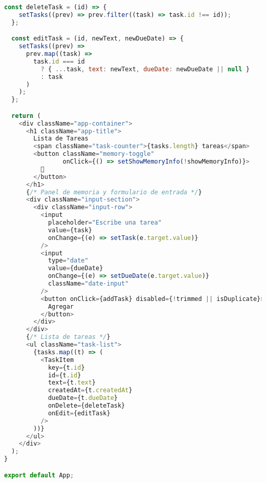 \documentclass[12pt,a4paper]{article}
\begin{document}
\begin{lstlisting}[language=JavaScript,caption={Estructura principal de la aplicación}]
  const deleteTask = (id) => {
    setTasks((prev) => prev.filter((task) => task.id !== id));
  };

  const editTask = (id, newText, newDueDate) => {
    setTasks((prev) => 
      prev.map((task) => 
        task.id === id 
          ? { ...task, text: newText, dueDate: newDueDate || null }
          : task
      )
    );
  };

  return (
    <div className="app-container">
      <h1 className="app-title">
        Lista de Tareas
        <span className="task-counter">{tasks.length} tareas</span>
        <button className="memory-toggle" 
                onClick={() => setShowMemoryInfo(!showMemoryInfo)}>
          💾
        </button>
      </h1>
      {/* Panel de memoria y formulario de entrada */}
      <div className="input-section">
        <div className="input-row">
          <input
            placeholder="Escribe una tarea"
            value={task}
            onChange={(e) => setTask(e.target.value)}
          />
          <input
            type="date"
            value={dueDate}
            onChange={(e) => setDueDate(e.target.value)}
            className="date-input"
          />
          <button onClick={addTask} disabled={!trimmed || isDuplicate}>
            Agregar
          </button>
        </div>
      </div>
      {/* Lista de tareas */}
      <ul className="task-list">
        {tasks.map((t) => (
          <TaskItem
            key={t.id}
            id={t.id}
            text={t.text}
            createdAt={t.createdAt}
            dueDate={t.dueDate}
            onDelete={deleteTask}
            onEdit={editTask}
          />
        ))}
      </ul>
    </div>
  );
}

export default App;
\end{lstlisting}
\end{document}
